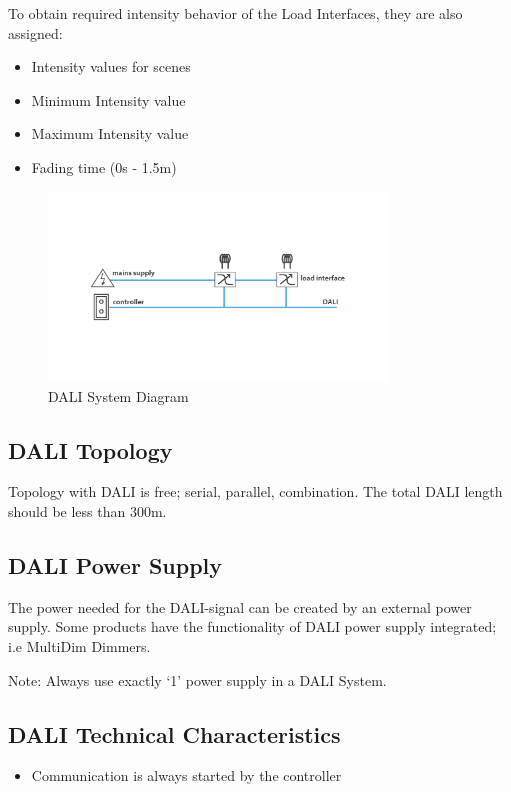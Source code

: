 \documentclass{article}
\begin{document}
To obtain required intensity behavior of the Load Interfaces, they are also assigned:
\begin{itemize}
\item Intensity values for scenes
\item Minimum Intensity value
\item Maximum Intensity value
\item Fading time (0s - 1.5m)
\end{itemize}

\begin{figure}[h]
\centering
\includegraphics[width = 0.8\textwidth]{images/system.png}
\caption{DALI System Diagram}
\end{figure}

\subsection{DALI Topology}
Topology with DALI is free; serial, parallel, combination. The total DALI length should be less than 300m.

\subsection{DALI Power Supply}
The power needed for the DALI-signal can be created by an external power supply. Some products have the functionality of DALI power supply integrated; i.e MultiDim Dimmers.

Note: Always use exactly `1' power supply in a DALI System.

\subsection{DALI Technical Characteristics}
\begin{itemize}
\item Communication is always started by the controller
\end{itemize}
\end{document}
